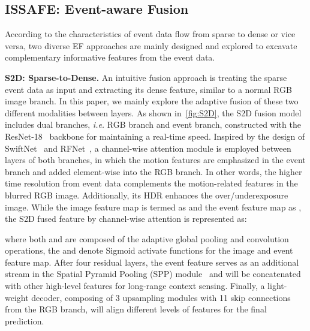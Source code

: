 \documentclass[letterpaper, 10 pt, conference]{ieeeconf}
\begin{document}
\subsection{ISSAFE: Event-aware Fusion}
According to the characteristics of event data flow from sparse to dense or vice versa, two diverse EF approaches are mainly designed and explored to excavate complementary informative features from the event data. 

\textbf{S2D: Sparse-to-Dense.} An intuitive fusion approach is treating the sparse event data as input and extracting its dense feature, similar to a normal RGB image branch. In this paper, we mainly explore the adaptive fusion of these two different modalities between layers. As shown in~\cref{fig:S2D}, the S2D fusion model includes dual branches, \textit{i.e.} RGB branch and event branch, constructed with the ResNet-18~\cite{he2016resnet} backbone for maintaining a real-time speed. 
Inspired by the design of SwiftNet~\cite{orsic2019swiftnet} and RFNet~\cite{sun2020rfnet}, a channel-wise attention module is employed between layers of both branches, in which the motion features are emphasized in the event branch and added element-wise into the RGB branch. In other words, the higher time resolution from event data complements the motion-related features in the blurred RGB image. Additionally, its HDR enhances the over/underexposure image. 
While the image feature map is termed as  and the event feature map as , the S2D fused feature  by channel-wise attention is represented as:

where both  and  are composed of the adaptive global pooling and  convolution operations, the  and  denote Sigmoid activate functions for the image and event feature map. 
After four residual layers, the event feature serves as an additional stream in the Spatial Pyramid Pooling (SPP) module~\cite{zhao2017PSPNet} and will be concatenated with other high-level features for long-range context sensing. Finally, a light-weight decoder, composing of 3 upsampling modules with 11 skip connections from the RGB branch, will align different levels of features for the final prediction. 
\end{document}
